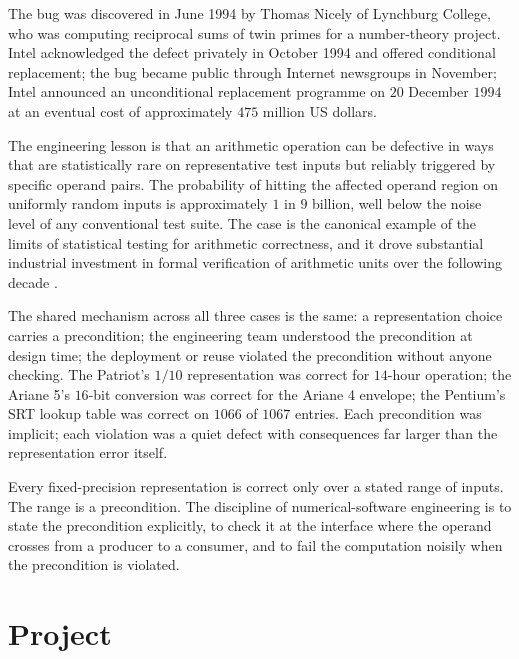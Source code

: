 The bug was discovered in June 1994 by Thomas Nicely of Lynchburg College, who was computing reciprocal sums of twin primes for a number-theory project. Intel acknowledged the defect privately in October 1994 and offered conditional replacement; the bug became public through Internet newsgroups in November; Intel announced an unconditional replacement programme on $20$ December $1994$ at an eventual cost of approximately $475$ million US dollars.

The engineering lesson is that an arithmetic operation can be defective in ways that are statistically rare on representative test inputs but reliably triggered by specific operand pairs. The probability of hitting the affected operand region on uniformly random inputs is approximately $1$ in $9$ billion, well below the noise level of any conventional test suite. The case is the canonical example of the limits of statistical testing for arithmetic correctness, and it drove substantial industrial investment in formal verification of arithmetic units over the following decade \cite{paper:edelman-1997}.

The shared mechanism across all three cases is the same: a representation choice carries a precondition; the engineering team understood the precondition at design time; the deployment or reuse violated the precondition without anyone checking. The Patriot's $1/10$ representation was correct for $14$-hour operation; the Ariane 5's $16$-bit conversion was correct for the Ariane 4 envelope; the Pentium's SRT lookup table was correct on $1066$ of $1067$ entries. Each precondition was implicit; each violation was a quiet defect with consequences far larger than the representation error itself.

\begin{principle}
Every fixed-precision representation is correct only over a stated range of inputs. The range is a precondition. The discipline of numerical-software engineering is to state the precondition explicitly, to check it at the interface where the operand crosses from a producer to a consumer, and to fail the computation noisily when the precondition is violated.
\end{principle}

\section{Project}


